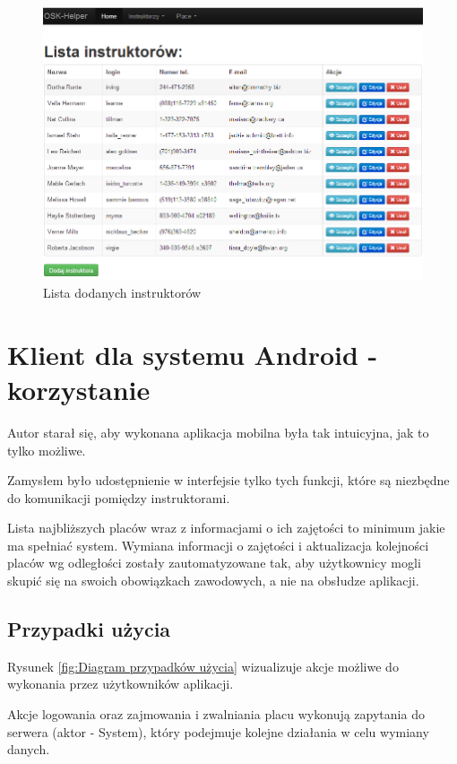\documentclass[twoside,a4paper,openright,12pt]{book}
\begin{document}
\begin{figure}[H]
\centering
\includegraphics[width=1\textwidth]{screenshots/panel/lista_instruktorow.png}
\caption{Lista dodanych instruktorów}
\label{fig:Lista_instruktorow}
\end{figure}


\chapter{Klient dla systemu Android - korzystanie}

Autor starał się, aby wykonana aplikacja mobilna była tak intuicyjna, jak to tylko możliwe.

Zamysłem było udostępnienie w interfejsie tylko tych funkcji, które są niezbędne do komunikacji pomiędzy instruktorami.

Lista najbliższych placów wraz z informacjami o ich zajętości to minimum jakie ma spełniać system. Wymiana informacji o zajętości i aktualizacja kolejności placów wg odległości zostały zautomatyzowane tak, aby użytkownicy mogli skupić się na swoich obowiązkach zawodowych, a nie na obsłudze aplikacji.



\section{Przypadki użycia}

Rysunek \ref{fig:Diagram przypadków użycia} wizualizuje akcje możliwe do wykonania przez użytkowników aplikacji.

Akcje logowania oraz zajmowania i zwalniania placu wykonują zapytania do serwera (aktor - System), który podejmuje kolejne działania w celu wymiany danych.
\end{document}

